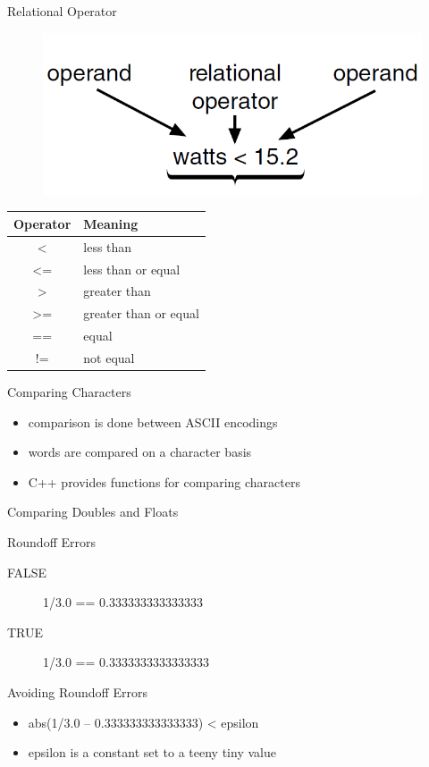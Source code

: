 \documentclass[xcolor={dvipsnames}]{beamer}
\begin{document}
\begin{frame}{Relational Operator}
	\begin{figure}
		\includegraphics[width=.5\textwidth]{ops}
	\end{figure}
	\pause
	\begin{center}
	\begin{tabular}{|c|l|}
		\hline
		\textbf{Operator} & \textbf{Meaning}\\
		\hline
		\textless & less than \\
		\textless= & less than or equal \\
		\textgreater & greater than \\
		\textgreater= & greater than or equal \\
		== & equal  \\
		!= & not equal \\
		\hline
	\end{tabular}
	\end{center}
\end{frame}

\begin{frame}{Comparing Characters}
	\begin{itemize}
		\item comparison is done between ASCII encodings 
		\item words are compared on a character basis
		\item C++ provides functions for comparing characters
	\end{itemize}
\end{frame}

\begin{frame}{Comparing Doubles and Floats}
	\begin{block}{Roundoff Errors}
		\begin{description}
			\item[FALSE] 1/3.0 == 0.333333333333333
			\item[TRUE] 1/3.0 == 0.3333333333333333
		\end{description}
	\end{block}
	\pause
	\begin{block}{Avoiding Roundoff Errors}
		\begin{itemize}
			\item abs(1/3.0 – 0.333333333333333) < epsilon
			\item epsilon is a constant set to a teeny tiny value
		\end{itemize}
	\end{block}
\end{frame}
\end{document}
